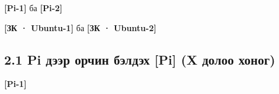 \textbf{{[}Pi-1{]}} ба \textbf{{[}Pi-2{]}}

\begin{Shaded}
\begin{Highlighting}[]
  \KeywordTok{\&\&} \KeywordTok{\&\&}  
 
\end{Highlighting}
\end{Shaded}

\textbf{{[}ЗК · Ubuntu-1{]}} ба \textbf{{[}ЗК · Ubuntu-2{]}}

\begin{Shaded}
\begin{Highlighting}[]
\KeywordTok{\&\&} 
 \OperatorTok{\textless{}}\OperatorTok{\textgreater{}}
\end{Highlighting}
\end{Shaded}

\hypertarget{pi-ux434ux44dux44dux440-ux43eux440ux447ux438ux43d-ux431ux44dux43bux434ux44dux445-pi-x-ux434ux43eux43bux43eux43e-ux445ux43eux43dux43eux433}{%
\subsection{2.1 Pi дээр орчин бэлдэх {[}Pi{]} (X долоо хоног)}\label{pi-ux434ux44dux44dux440-ux43eux440ux447ux438ux43d-ux431ux44dux43bux434ux44dux445-pi-x-ux434ux43eux43bux43eux43e-ux445ux43eux43dux43eux433}}

\textbf{{[}Pi-1{]}}

\begin{Shaded}
\begin{Highlighting}[]
 
  
\end{Highlighting}
\end{Shaded}

